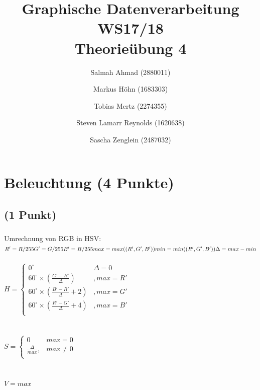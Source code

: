 \documentclass[a4paper,10pt,DIV=14]{article}
\begin{document}
\title{Graphische Datenverarbeitung WS17/18 \\ Theorieübung 4}
\author{
  Salmah Ahmad (2880011)
  \and
  Markus Höhn (1683303)
  \and
  Tobias Mertz (2274355)
  \and
  Steven Lamarr Reynolds (1620638)
  \and
  Sascha Zenglein (2487032)
}

\maketitle

\section{Beleuchtung (4 Punkte)}

\subsection{(1 Punkt)}

\subsubsection{}

Umrechnung von RGB in HSV: \\
\newline
$
R' = R/255\\
G' = G/255\\
B' = B/255\\
max = max((R', G', B'))\\
min = min((R', G', B'))\\
\Delta = max - min
$\\~\\
$
H = \begin{cases}
0^\circ &\Delta = 0\\
60^\circ \times (\frac{G'-B'}{\Delta}) &, max = R'\\
60^\circ \times (\frac{B'-R'}{\Delta}+2) &, max = G'\\
60^\circ \times (\frac{R'-G'}{\Delta}+4) &, max = B'\\
\end{cases}
$\\~\\~\\
$
S = \begin{cases}
0 & max = 0\\
\frac{\Delta}{max}, &max \neq 0\\
\end{cases}
$\\~\\~\\
$
V = max
$\\
\end{document}
